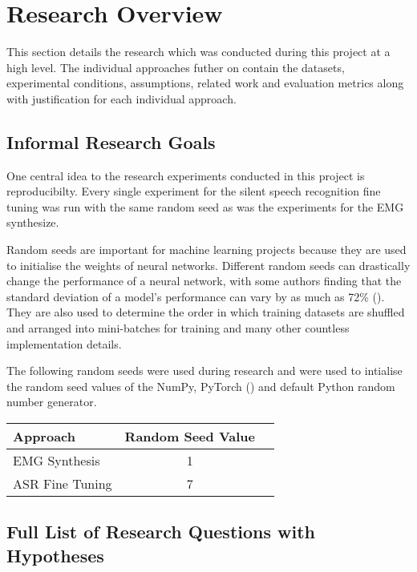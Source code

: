 \chapter{Research Overview} \label{chap:research-overview}

This section details the research which was conducted during this project
at a high level. The individual approaches futher on contain the datasets,
experimental conditions, assumptions, related work and evaluation metrics
along with justification for each individual approach.

\section{Informal Research Goals}

One central idea to the research experiments conducted in this project
is reproducibilty. Every single experiment for the silent speech
recognition fine tuning was run with the same random seed as was the
experiments for the EMG synthesize.

Random seeds are important for machine learning projects because
they are used to initialise the weights of neural networks. Different
random seeds can drastically change the performance of a neural network,
with some authors finding that the standard deviation of a model's performance
can vary by as much as 72\% (\cite{random_seed_variance}).
They are also used to determine
the order in which training datasets
are shuffled and arranged into mini-batches for training and many
other countless implementation details.

The following random seeds were used during research and were used
to intialise the random seed values of the NumPy,
PyTorch (\cite{pytorch}) and default Python random number generator.

{\small\begin{center}
    \begin{tabular} {  l  c  c  }
    \hline
    Approach & Random Seed Value \\
    \hline
    EMG Synthesis & 1 \\
    ASR Fine Tuning & 7 \\
    \end{tabular}
\end{center}}

\section{Full List of Research Questions with Hypotheses}


